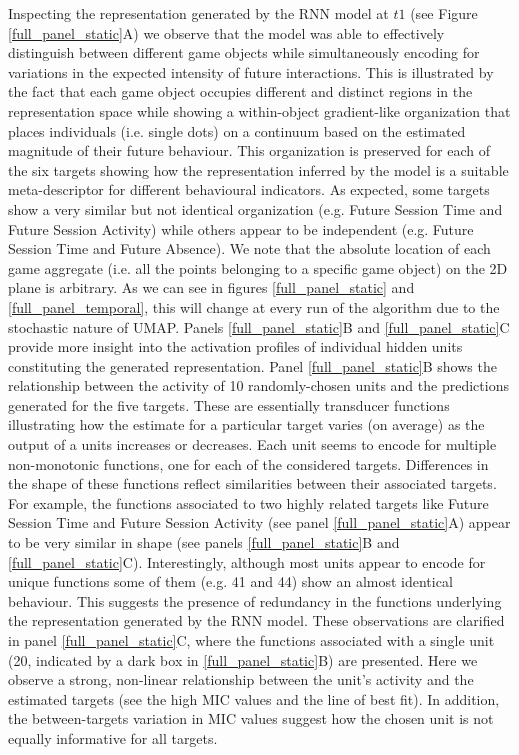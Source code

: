 Inspecting the representation generated by the RNN model at $t1$ (see Figure \ref{full_panel_static}A) we observe that the model was able to effectively distinguish between different game objects while simultaneously encoding for variations in the expected intensity of future interactions. This is illustrated by the fact that each game object occupies different and distinct regions in the representation space while showing a within-object gradient-like organization that places individuals (i.e. single dots) on a continuum based on the estimated magnitude of their future behaviour. This organization is preserved for each of the six targets showing how the representation inferred by the model is a suitable meta-descriptor for different behavioural indicators. As expected, some targets show a very similar but not identical organization (e.g. Future Session Time and Future Session Activity) while others appear to be independent (e.g. Future Session Time and Future Absence). We note that the absolute location of each game aggregate (i.e. all the points belonging to a specific game object) on the 2D plane is arbitrary. As we can see in figures \ref{full_panel_static} and \ref{full_panel_temporal}, this will change at every run of the algorithm due to the stochastic nature of UMAP. Panels \ref{full_panel_static}B and \ref{full_panel_static}C provide more insight into the activation profiles of individual hidden units constituting the generated representation. Panel \ref{full_panel_static}B shows the relationship between the activity of 10 randomly-chosen units and the predictions generated for the five targets. These are essentially transducer functions illustrating how the estimate for a particular target varies (on average) as the output of a units increases or decreases. Each unit seems to encode for multiple non-monotonic functions, one for each of the considered targets. Differences in the shape of these functions reflect similarities between their associated targets. For example, the functions associated to two highly related targets like Future Session Time and Future Session Activity (see panel \ref{full_panel_static}A) appear to be very similar in shape (see panels \ref{full_panel_static}B and \ref{full_panel_static}C). Interestingly, although most units appear to encode for unique functions some of them (e.g. 41 and 44) show an almost identical behaviour. This suggests the presence of redundancy in the functions underlying the representation generated by the RNN model. These observations are clarified in panel \ref{full_panel_static}C, where the functions associated with a single unit (20, indicated by a dark box in \ref{full_panel_static}B) are presented. Here we observe a strong, non-linear relationship between the unit's activity and the estimated targets (see the high MIC values and the line of best fit). In addition, the between-targets variation in MIC values suggest how the chosen unit is not equally informative for all targets.

